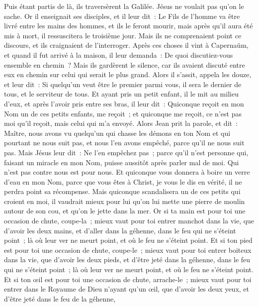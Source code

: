 \begin{multicols}{2}
Puis étant partis de là, ils traversèrent la Galilée. Jésus ne voulait pas qu'on le sache.
Or il enseignait ses disciples, et il leur dit~: Le Fils de l'homme va être livré entre les mains des hommes, et ils le feront mourir, mais après qu'il aura été mis à mort, il ressuscitera le troisième jour.
Mais ils ne comprenaient point ce discours, et ils craignaient de l'interroger.
Après ces choses il vint à Capernaüm, et quand il fut arrivé à la maison, il leur demanda~: De quoi discutiez-vous ensemble en chemin~?
Mais ils gardèrent le silence, car ils avaient discuté entre eux en chemin sur celui qui serait le plus grand.
Alors il s'assit, appela les douze, et leur dit~: Si quelqu'un veut être le premier parmi vous, il sera le dernier de tous, et le serviteur de tous.
Et ayant pris un petit enfant, il le mit au milieu d'eux, et après l'avoir pris entre ses bras, il leur dit~:
Quiconque reçoit en mon Nom un de ces petits enfants, me reçoit~; et quiconque me reçoit, ce n'est pas moi qu'il reçoit, mais celui qui m'a envoyé.
Alors Jean prit la parole, et dit~: Maître, nous avons vu quelqu'un qui chasse les démons en ton Nom et qui pourtant ne nous suit pas, et nous l'en avons empêché, parce qu'il ne nous suit pas.
Mais Jésus leur dit~: Ne l'en empêchez pas~; parce qu'il n'est personne qui, faisant un miracle en mon Nom, puisse aussitôt après parler mal de moi.
Qui n'est pas contre nous est pour nous.
Et quiconque vous donnera à boire un verre d'eau en mon Nom, parce que vous êtes à Christ, je vous le dis en vérité, il ne perdra point sa récompense.
Mais quiconque scandalisera un de ces petits qui croient en moi, il vaudrait mieux pour lui qu'on lui mette une pierre de moulin autour de son cou, et qu'on le jette dans la mer.
Or si ta main est pour toi une occasion de chute, coupe-la~; mieux vaut pour toi entrer manchot dans la vie, que d'avoir les deux mains, et d'aller dans la géhenne, dans le feu qui ne s'éteint point~;
là où leur ver ne meurt point, et où le feu ne s'éteint point.
Et si ton pied est pour toi une occasion de chute, coupe-le~; mieux vaut pour toi entrer boiteux dans la vie, que d'avoir les deux pieds, et d'être jeté dans la géhenne, dans le feu qui ne s'éteint point~;
là où leur ver ne meurt point, et où le feu ne s'éteint point.
Et si ton œil est pour toi une occasion de chute, arrache-le~; mieux vaut pour toi entrer dans le Royaume de Dieu n'ayant qu'un œil, que d'avoir les deux yeux, et d'être jeté dans le feu de la géhenne,

\end{multicols}
